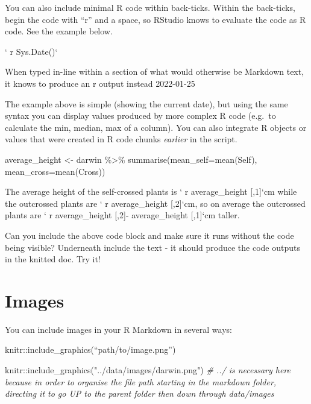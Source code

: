 \documentclass[
]{book}
\makeatletter
\newenvironment{Shaded}{\begin{snugshade}}{\end{snugshade}}
\newcommand{\AttributeTok}[1]{\textcolor[rgb]{0.77,0.63,0.00}{#1}}
\newcommand{\CommentTok}[1]{\textcolor[rgb]{0.56,0.35,0.01}{\textit{#1}}}
\newcommand{\FunctionTok}[1]{\textcolor[rgb]{0.00,0.00,0.00}{#1}}
\newcommand{\NormalTok}[1]{#1}
\newcommand{\OtherTok}[1]{\textcolor[rgb]{0.56,0.35,0.01}{#1}}
\newcommand{\SpecialCharTok}[1]{\textcolor[rgb]{0.00,0.00,0.00}{#1}}
\newcommand{\StringTok}[1]{\textcolor[rgb]{0.31,0.60,0.02}{#1}}
\newenvironment{kframe}{%
\medskip{}
\setlength{\fboxsep}{.8em}
 \def\at@end@of@kframe{}%
 \ifinner\ifhmode%
  \def\at@end@of@kframe{\end{minipage}}%
  \begin{minipage}{\columnwidth}%
 \fi\fi%
 \def\FrameCommand##1{\hskip\@totalleftmargin \hskip-\fboxsep
 \colorbox{shadecolor}{##1}\hskip-\fboxsep
     \hskip-\linewidth \hskip-\@totalleftmargin \hskip\columnwidth}%
 \MakeFramed {\advance\hsize-\width
   \@totalleftmargin\z@ \linewidth\hsize
   \@setminipage}}%
 {\par\unskip\endMakeFramed%
 \at@end@of@kframe}
\newenvironment{block}[1]
  {
  \begin{itemize}
  \renewcommand{\labelitemi}{
    \raisebox{-.7\height}[0pt][0pt]{
      {\setkeys{Gin}{width=3em,keepaspectratio}\texttt{[image: images/\#1]}}
    }
  }
  \setlength{\fboxsep}{1em}
  \begin{kframe}
  \item
  }
  {
  \end{kframe}
  \end{itemize}
  }
\newenvironment{rmdquestion}
  {\begin{block}{question}}
  {\end{block}}
\makeatother
\begin{document}
You can also include minimal R code within back-ticks. Within the back-ticks, begin the code with ``r'' and a space, so RStudio knows to evaluate the code as R code. See the example below.

` r Sys.Date()`

When typed in-line within a section of what would otherwise be Markdown text, it knows to produce an r output instead 2022-01-25

The example above is simple (showing the current date), but using the same syntax you can display values produced by more complex R code (e.g.~to calculate the min, median, max of a column). You can also integrate R objects or values that were created in R code chunks \emph{earlier} in the script.

\begin{Shaded}
\begin{Highlighting}[]
\NormalTok{average\_height }\OtherTok{\textless{}{-}}\NormalTok{ darwin }\SpecialCharTok{\%\textgreater{}\%} 
  \FunctionTok{summarise}\NormalTok{(}\AttributeTok{mean\_self=}\FunctionTok{mean}\NormalTok{(Self),}
            \AttributeTok{mean\_cross=}\FunctionTok{mean}\NormalTok{(Cross))}
\end{Highlighting}
\end{Shaded}

The average height of the self-crossed plants is ` r average\_height {[},1{]}`cm while the outcrossed plants are ` r average\_height {[},2{]}`cm, so on average the outcrossed plants are ` r average\_height {[},2{]}- average\_height {[},1{]}`cm taller.

\begin{rmdquestion}
Can you include the above code block and make sure it runs without the
code being visible? Underneath include the text - it should produce the
code outputs in the knitted doc. Try it!
\end{rmdquestion}

\hypertarget{images}{%
\section{Images}\label{images}}

You can include images in your R Markdown in several ways:

knitr::include\_graphics(``path/to/image.png'')

\begin{Shaded}
\begin{Highlighting}[]
\NormalTok{knitr}\SpecialCharTok{::}\FunctionTok{include\_graphics}\NormalTok{(}\StringTok{"../data/images/darwin.png"}\NormalTok{)}
\CommentTok{\# ../ is necessary here because in order to organise the file path starting in the markdown folder, directing it to go UP to the parent folder then down through data/images}
\end{Highlighting}
\end{Shaded}
\end{document}
